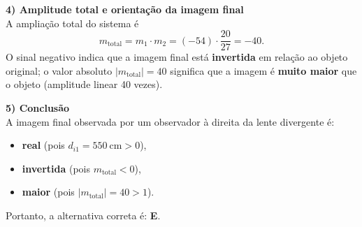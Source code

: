\begin{flushleft}
\medskip

\textbf{4) Amplitude total e orienta\c{c}\~ao da imagem final} \\
A amplia\c{c}\~ao total do sistema \'e
\[
m_{\text{total}}=m_1\cdot m_2
=(-54)\cdot\frac{20}{27}=-40.
\]
O sinal negativo indica que a imagem final est\'a \textbf{invertida} em rela\c{c}\~ao ao objeto original; o valor absoluto $|m_{\text{total}}|=40$ significa que a imagem \'e \textbf{muito maior} que o objeto (amplitude linear 40 vezes).

\medskip

\textbf{5) Conclus\~ao} \\
A imagem final observada por um observador \`a direita da lente divergente \'e:
\begin{itemize}
  \item \textbf{real} (pois $d_{i1}=550\ \mathrm{cm}>0$),
  \item \textbf{invertida} (pois $m_{\text{total}}<0$),
  \item \textbf{maior} (pois $|m_{\text{total}}|=40>1$).
\end{itemize}

Portanto, a alternativa correta \'e: \colorbox{green!50}{\textbf{E}}.

\end{flushleft}

%
%
%
%
%
%
%




